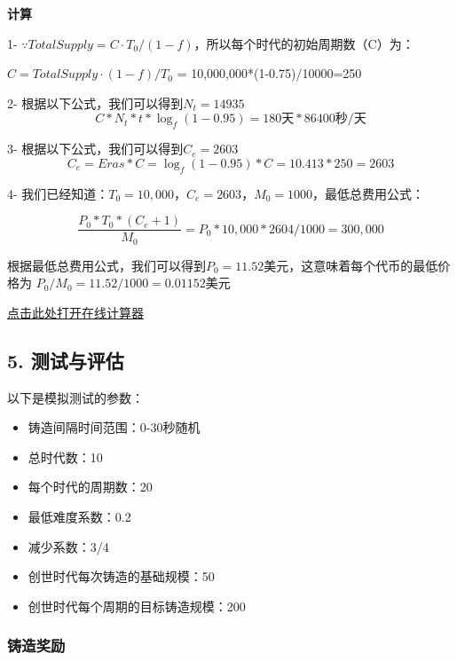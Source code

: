 \documentclass[
]{article}
\providecommand{\tightlist}{%
  \setlength{\itemsep}{0pt}\setlength{\parskip}{0pt}}
\begin{document}
\textbf{计算}

1-
\(\because TotalSupply = C \cdot T_0 / (1-f)\)，所以每个时代的初始周期数（C）为：

\(C = TotalSupply \cdot (1 - f) / T_0\) = 10,000,000*(1-0.75)/10000=250

2- 根据以下公式，我们可以得到\(N_t = 14935\) \begin{equation}
C * N_t * t * \log_f(1-0.95) = 180天 * 86400秒/天
\end{equation}

3- 根据以下公式，我们可以得到\(C_e = 2603\) \begin{equation}
C_e = Eras * C = \log_f(1-0.95) * C = 10.413 * 250 = 2603
\end{equation}

4-
我们已经知道：\(T_0=10,000\)，\(C_e=2603\)，\(M_0=1000\)，最低总费用公式：

\begin{equation}
\frac{P_0 * T_0 * (C_e+1)}{M_0} = P_0 * 10,000 * 2604 / 1000 = 300,000
\end{equation}

根据最低总费用公式，我们可以得到\(P_0 = 11.52\)美元，这意味着每个代币的最低价格为
\(P_0 / M_0 = 11.52 / 1000 = 0.01152\)美元

\href{https://docs.google.com/spreadsheets/d/1z4eO1k14noxTMcgADMc-I0xFXT0giMFPSBEGal4suvI/edit?usp=sharing}{点击此处打开在线计算器}

\subsection{5. 测试与评估}\label{ux6d4bux8bd5ux4e0eux8bc4ux4f30}

以下是模拟测试的参数：

\begin{itemize}
\tightlist
\item
  铸造间隔时间范围：0-30秒随机
\item
  总时代数：10
\item
  每个时代的周期数：20
\item
  最低难度系数：0.2
\item
  减少系数：3/4
\item
  创世时代每次铸造的基础规模：50
\item
  创世时代每个周期的目标铸造规模：200
\end{itemize}

\subsubsection{铸造奖励}\label{ux94f8ux9020ux5956ux52b1}
\end{document}
